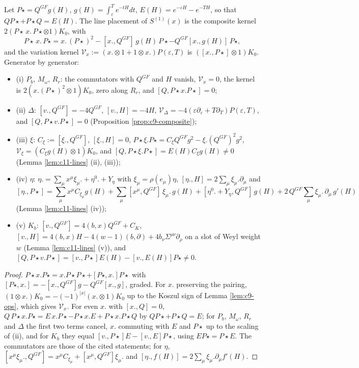 \begin{proposition}
\label{prop:c12-composite}
Let $P\star=Q^{GF}g(H)$, $g(H)=\int_\varepsilon^Te^{-tH}dt$, $E(H)=e^{-\varepsilon H}-e^{-TH}$, so that $QP\star+P\star Q=E(H)$. The line placement of $S^{(1)}(x)$ is the composite kernel $2(P\star\,x.\,P\star\otimes1)K_0$, with
\begin{equation}
P\star\,x.\,P\star=x.\,(P\star)^2-[x.,Q^{GF}]\,g(H)\,P\star-Q^{GF}[x.,g(H)]\,P\star ,
\label{eq:c12-line}
\end{equation}
and the variation kernel $\mathcal V_x:=(x.\otimes1+1\otimes x.)P(\varepsilon,T)$ is $([x.,P\star]\otimes1)K_0$. Generator by generator:
\begin{itemize}
\item (i) $P_b$, $M_\omega$, $R_r$: the commutators with $Q^{GF}$ and $H$ vanish, $\mathcal V_x=0$, the kernel is $2(x.(P\star)^2\otimes1)K_0$, zero along $R_r$, and $[Q,P\star x.P\star]=0$;
\item (ii) $\Delta$: $[v.,Q^{GF}]=-4Q^{GF}$, $[v.,H]=-4H$, $\mathcal V_\Delta=-4(\varepsilon\partial_\varepsilon+T\partial_T)P(\varepsilon,T)$, and $[Q,P\star v.P\star]=0$ (Proposition \ref{prop:c9-composite});
\item (iii) $\xi$: $C_\xi:=[\xi.,Q^{GF}]$, $[\xi.,H]=0$, $P\star\xi.P\star=C_\xi Q^{GF}g^2-\xi.(Q^{GF})^2g^2$, $\mathcal V_\xi=(C_\xi g(H)\otimes1)K_0$, and $[Q,P\star\xi.P\star]=E(H)C_\xi g(H)\neq0$ (Lemma \ref{lem:c11-lines} (ii), (iii));
\item (iv) $\eta$: $\eta.=\sum_\mu x^\mu\xi_\mu.+\eta^0.+Y_\eta$ with $\xi_\mu=\rho(e_\mu)\eta$, $[\eta.,H]=2\sum_\mu\xi_\mu.\partial_\mu$ and
\[
[\eta.,P\star]=\sum_\mu x^\mu C_{\xi_\mu}g(H)+\sum_\mu[x^\mu,Q^{GF}]\,\xi_\mu.\,g(H)+[\eta^0.+Y_\eta,Q^{GF}]\,g(H)+2\,Q^{GF}\sum_\mu\xi_\mu.\,\partial_\mu\,g'(H)
\]
(Lemma \ref{lem:c11-lines} (iv));
\item (v) $K_b$: $[v.,Q^{GF}]=4(b,x)Q^{GF}+C_K$, $[v.,H]=4(b,x)H-4(w-1)(b,\partial)+4b_\nu\Sigma^{\rho\nu}\partial_\rho$ on a slot of Weyl weight $w$ (Lemma \ref{lem:c11-lines} (v)), and $[Q,P\star v.P\star]=[v.,P\star]E(H)-[v.,E(H)]P\star\neq0$.
\end{itemize}
\end{proposition}

\begin{proof}
$P\star x.P\star=x.P\star P\star+[P\star,x.]P\star$ with $[P\star,x.]=-[x.,Q^{GF}]g-Q^{GF}[x.,g]$, graded. For $x.$ preserving the pairing, $(1\otimes x.)K_0=-(-1)^{|x|}(x.\otimes1)K_0$ up to the Koszul sign of Lemma \ref{lem:c9-ops}, which gives $\mathcal V_x$. For even $x.$ with $[x.,Q]=0$, $Q\,P\star x.P\star=E\,x.P\star-P\star x.E+P\star x.P\star Q$ by $QP\star+P\star Q=E$; for $P_b$, $M_\omega$, $R_r$ and $\Delta$ the first two terms cancel, $x.$ commuting with $E$ and $P\star$ up to the scaling of (ii), and for $K_b$ they equal $[v.,P\star]E-[v.,E]P\star$, using $EP\star=P\star E$. The commutators are those of the cited statements; for $\eta$, $[x^\mu\xi_\mu.,Q^{GF}]=x^\mu C_{\xi_\mu}+[x^\mu,Q^{GF}]\xi_\mu.$ and $[\eta.,f(H)]=2\sum_\mu\xi_\mu.\partial_\mu f'(H)$.
\end{proof}

